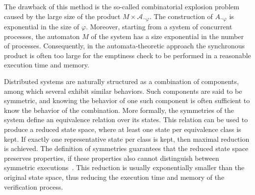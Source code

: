 The drawback of this method is the so-called combinatorial explosion problem~\cite{Valmari96} 
caused by the large size of the product $M \times \mathcal{A}_{\neg \varphi}$. 
The construction of $A_{\neg \varphi}$ is exponential in the size of $\varphi$. Moreover, 
starting from a system of concurrent processes, the automaton $M$ of the system has a size exponential in the number of processes. Consequently, in the automata-theoretic approach the synchronous product is often too large for the emptiness check to be performed in a reasonable execution time and memory.	

Distributed systems are naturally structured as a combination of components, among which several exhibit similar behaviors. Such components are said to be symmetric, and knowing the behavior of one such component is often sufficient to know the behavior of the combination. More formally, the symmetries of the system define an equivalence relation over its states. This relation can be used to produce a reduced state space, where at least one state per equivalence class is kept.
If exactly one representative state per class is kept, then maximal reduction is achieved. The definition of symmetries guarantees that the reduced state space preserves properties, if these properties also cannot distinguish between symmetric executions~\cite{ClarkeJEF96, EmersonS96}. This reduction is usually exponentially smaller than the original state space, thus reducing the execution time and memory of the verification process.


